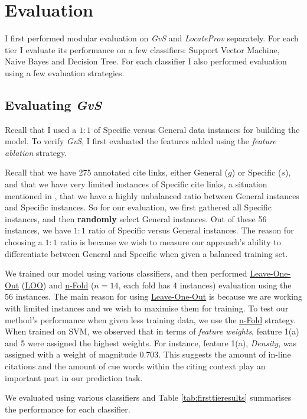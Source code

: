 \chapter{Evaluation}
\label{evaluation}
I first performed modular evaluation on {\it GvS} and {\it LocateProv} separately. For each tier I evaluate its performance on a few classifiers: Support Vector Machine, Naive Bayes and Decision Tree. For each classifier I also performed evaluation using a few evaluation strategies.

\section{Evaluating {\it GvS}}
Recall that I used a $1:1$ of Specific versus General data instances for building the model. To verify {\it GvS}, I first evaluated the features added using the {\it feature ablation} strategy.

Recall that we have 275 annotated cite links, either General ($g$) or Specific ($s$), and that we have very limited instances of Specific cite links, a situation mentioned in \cite{li2010negative}, that we have a highly unbalanced ratio between General instances and Specific instances. So for our evaluation, we first gathered all Specific instances, and then \textbf{randomly} select General instances. Out of these 56 instances, we have $1:1$ ratio of Specific versus General instances. The reason for choosing a $1:1$ ratio is because we wish to measure our approach's ability to differentiate between General and Specific when given a balanced training set.

We trained our model using various classifiers, and then performed \url{Leave-One-Out} (\url{LOO}) and \url{n-Fold} ($n=14$, each fold has 4 instances) evaluation using the 56 instances. The main reason for using \url{Leave-One-Out} is because we are working with limited instances and we wish to maximise them for training. To test our method's performance when given less training data, we use the \url{n-Fold} strategy. When trained on SVM, we observed that in terms of \textit{feature weights}, feature 1(a) and 5 were assigned the highest weights. For instance, feature 1(a), \textit{Density}, was assigned with a weight of magnitude 0.703. This suggests the amount of in-line citations and the amount of cue words within the citing context play an important part in our prediction task.

We evaluated using various classifiers and Table \ref{tab:firsttieresults} summarises the performance for each classifier.

